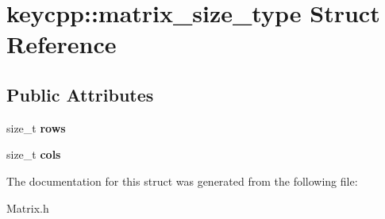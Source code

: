 \hypertarget{structkeycpp_1_1matrix__size__type}{\section{keycpp\-:\-:matrix\-\_\-size\-\_\-type Struct Reference}
\label{structkeycpp_1_1matrix__size__type}
}
\subsection*{Public Attributes}
\begin{DoxyCompactItemize}
\item 
\hypertarget{structkeycpp_1_1matrix__size__type_a25a616d584e78820d6b00c689e39038e}{size\-\_\-t {\bfseries rows}}\label{structkeycpp_1_1matrix__size__type_a25a616d584e78820d6b00c689e39038e}

\item 
\hypertarget{structkeycpp_1_1matrix__size__type_a4115aab64a45e14a9e77d575ffdda951}{size\-\_\-t {\bfseries cols}}\label{structkeycpp_1_1matrix__size__type_a4115aab64a45e14a9e77d575ffdda951}

\end{DoxyCompactItemize}


The documentation for this struct was generated from the following file\-:\begin{DoxyCompactItemize}
\item 
Matrix.\-h\end{DoxyCompactItemize}
